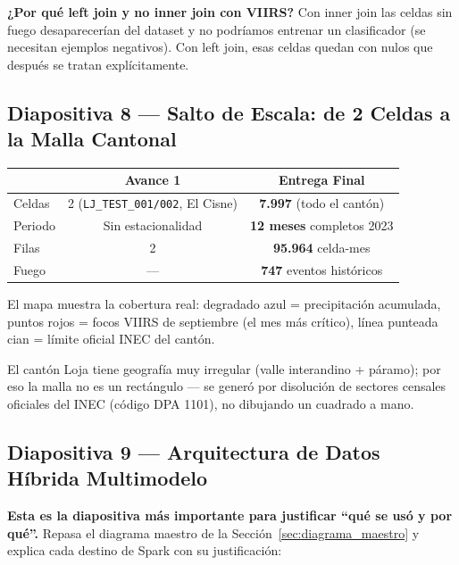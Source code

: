 \documentclass[11pt,a4paper]{article}
\begin{document}
\begin{alertabox}
\textbf{¿Por qu\'e left join y no inner join con VIIRS?} Con inner join las celdas sin fuego desaparecer\'ian del dataset y no podr\'iamos entrenar un clasificador (se necesitan ejemplos negativos). Con left join, esas celdas quedan con nulos que despu\'es se tratan expl\'icitamente.
\end{alertabox}

\subsection{Diapositiva 8 --- Salto de Escala: de 2 Celdas a la Malla Cantonal}

\begin{table}[H]
\centering
\small
\begin{tabular}{@{}lcc@{}}
\toprule
 & \textbf{Avance 1} & \textbf{Entrega Final} \\
\midrule
Celdas & 2 (\texttt{LJ\_TEST\_001/002}, El Cisne) & \textbf{7.997} (todo el cant\'on) \\
Periodo & Sin estacionalidad & \textbf{12 meses} completos 2023 \\
Filas & 2 & \textbf{95.964} celda-mes \\
Fuego & --- & \textbf{747} eventos hist\'oricos \\
\bottomrule
\end{tabular}
\end{table}

\begin{decirbox}
El mapa muestra la cobertura real: degradado azul = precipitaci\'on acumulada, puntos rojos = focos VIIRS de septiembre (el mes m\'as cr\'itico), l\'inea punteada cian = l\'imite oficial INEC del cant\'on.
\end{decirbox}

\begin{datobox}
El cant\'on Loja tiene geograf\'ia muy irregular (valle interandino + p\'aramo); por eso la malla no es un rect\'angulo --- se gener\'o por disoluci\'on de sectores censales oficiales del INEC (c\'odigo DPA 1101), no dibujando un cuadrado a mano.
\end{datobox}

\subsection{Diapositiva 9 --- Arquitectura de Datos H\'ibrida Multimodelo}

\textbf{Esta es la diapositiva m\'as importante para justificar ``qu\'e se us\'o y por qu\'e''.} Repasa el diagrama maestro de la Secci\'on~\ref{sec:diagrama_maestro} y explica cada destino de Spark con su justificaci\'on:
\end{document}
